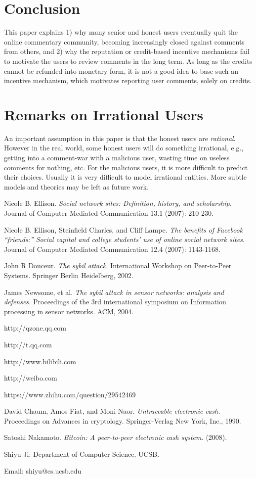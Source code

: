 \documentclass[12pt]{article}
\begin{document}
\section{Conclusion}
This paper explains 1) why many senior and honest users eventually quit the online commentary community, becoming increasingly closed against comments from others, and 2) why the reputation or credit-based incentive mechanisms fail to motivate the users to review comments in the long term. As long as the credits cannot be refunded into monetary form, it is not a good idea to base such an incentive mechanism, which motivates reporting user comments, solely on credits.

\section{Remarks on Irrational Users}
An important assumption in this paper is that the honest users are \emph{rational}. However in the real world, some honest users will do something irrational, e.g., getting into a comment-war with a malicious user, wasting time on useless comments for nothing, etc. For the malicious users, it is more difficult to predict their choices. Usually it is very difficult to model irrational entities. More subtle models and theories may be left as future work.

\begin{thebibliography}{19}
Nicole B. Ellison. \textit{Social network sites: Definition, history, and scholarship.} Journal of Computer Mediated Communication 13.1 (2007): 210-230.

Nicole B. Ellison, Steinfield Charles, and Cliff Lampe. \textit{The benefits of Facebook ``friends:'' Social capital and college students' use of online social network sites.} Journal of Computer Mediated Communication 12.4 (2007): 1143-1168.

John R Douceur. \textit{The sybil attack.} International Workshop on Peer-to-Peer Systems. Springer Berlin Heidelberg, 2002.

James Newsome, et al. \textit{The sybil attack in sensor networks: analysis and defenses.} Proceedings of the 3rd international symposium on Information processing in sensor networks. ACM, 2004.

http://qzone.qq.com

http://t.qq.com

http://www.bilibili.com

http://weibo.com

https://www.zhihu.com/question/29542469

David Chaum, Amos Fiat, and Moni Naor. \textit{Untraceable electronic cash.} Proceedings on Advances in cryptology. Springer-Verlag New York, Inc., 1990.

Satoshi Nakamoto. \textit{Bitcoin: A peer-to-peer electronic cash system.} (2008).
\end{thebibliography}

Shiyu Ji: Department of Computer Science, UCSB.

Email: shiyu@cs.ucsb.edu
\end{document}
